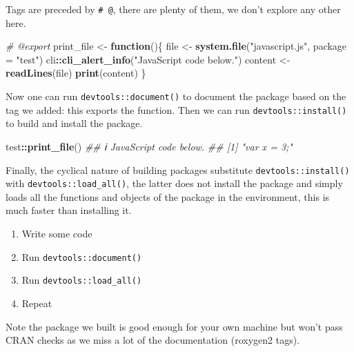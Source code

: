 \documentclass[
]{krantz}
\makeatletter
\newenvironment{Shaded}{\begin{snugshade}}{\end{snugshade}}
\newcommand{\CommentTok}[1]{\textcolor[rgb]{0.37,0.37,0.37}{\textit{#1}}}
\newcommand{\ControlFlowTok}[1]{\textcolor[rgb]{0.27,0.27,0.27}{\textbf{#1}}}
\newcommand{\DataTypeTok}[1]{\textcolor[rgb]{0.27,0.27,0.27}{#1}}
\newcommand{\KeywordTok}[1]{\textcolor[rgb]{0.27,0.27,0.27}{\textbf{#1}}}
\newcommand{\NormalTok}[1]{#1}
\newcommand{\OperatorTok}[1]{\textcolor[rgb]{0.43,0.43,0.43}{\textbf{#1}}}
\newcommand{\StringTok}[1]{\textcolor[rgb]{0.5,0.5,0.5}{#1}}
\providecommand{\tightlist}{%
  \setlength{\itemsep}{0pt}\setlength{\parskip}{0pt}}
\newenvironment{kframe}{%
\medskip{}
\setlength{\fboxsep}{.8em}
 \def\at@end@of@kframe{}%
 \ifinner\ifhmode%
  \def\at@end@of@kframe{\end{minipage}}%
  \begin{minipage}{\columnwidth}%
 \fi\fi%
 \def\FrameCommand##1{\hskip\@totalleftmargin \hskip-\fboxsep
 \colorbox{shadecolor}{##1}\hskip-\fboxsep
     \hskip-\linewidth \hskip-\@totalleftmargin \hskip\columnwidth}%
 \MakeFramed {\advance\hsize-\width
   \@totalleftmargin\z@ \linewidth\hsize
   \@setminipage}}%
 {\par\unskip\endMakeFramed%
 \at@end@of@kframe}
\renewenvironment{Shaded}{\begin{kframe}}{\end{kframe}}
\makeatother
\begin{document}
Tags are preceded by \texttt{\#\textquotesingle{}\ @}, there are plenty of them, we don't explore any other here.

\begin{Shaded}
\begin{Highlighting}[]
\CommentTok{\#\textquotesingle{} @export}
\NormalTok{print\_file <{-}}\StringTok{ }\ControlFlowTok{function}\NormalTok{()\{}
\NormalTok{  file <{-}}\StringTok{ }\KeywordTok{system.file}\NormalTok{(}\StringTok{"javascript.js"}\NormalTok{, }\DataTypeTok{package =} \StringTok{"test"}\NormalTok{)}
\NormalTok{  cli}\OperatorTok{::}\KeywordTok{cli\_alert\_info}\NormalTok{(}\StringTok{"JavaScript code below."}\NormalTok{)}
\NormalTok{  content <{-}}\StringTok{ }\KeywordTok{readLines}\NormalTok{(file)}
  \KeywordTok{print}\NormalTok{(content)}
\NormalTok{\}}
\end{Highlighting}
\end{Shaded}

Now one can run \texttt{devtools::document()} to document the package based on the tag we added: this exports the function. Then we can run \texttt{devtools::install()} to build and install the package.

\begin{Shaded}
\begin{Highlighting}[]
\NormalTok{test}\OperatorTok{::}\KeywordTok{print\_file}\NormalTok{()}
\CommentTok{\#\# ℹ JavaScript code below.}
\CommentTok{\#\# [1] "var x = 3;"}
\end{Highlighting}
\end{Shaded}

Finally, the cyclical nature of building packages substitute \texttt{devtools::install()} with \texttt{devtools::load\_all()}, the latter does not install the package and simply loads all the functions and objects of the package in the environment, this is much faster than installing it.

\begin{enumerate}
\def\labelenumi{\arabic{enumi}.}
\tightlist
\item
  Write some code
\item
  Run \texttt{devtools::document()}
\item
  Run \texttt{devtools::load\_all()}
\item
  Repeat
\end{enumerate}

Note the package we built is good enough for your own machine but won't pass CRAN checks as we miss a lot of the documentation (roxygen2 tags).
\end{document}
